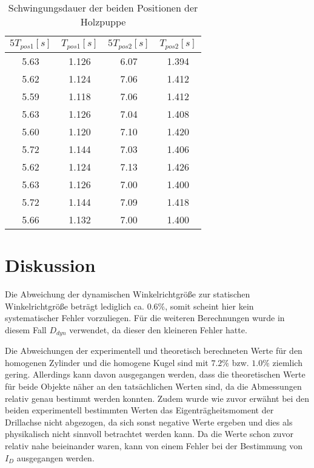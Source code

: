 \begin{table}
  \centering
  \caption{Schwingungsdauer der beiden Positionen der Holzpuppe}
  \begin{tabular}{c c | c c}
    \toprule $5T_{pos1} [s]$ & $T_{pos1} [s]$ & $5T_{pos2} [s]$ & $T_{pos2} [s]$ \\
    \midrule
    5.63 & 1.126 & 6.07 & 1.394 \\
    5.62 & 1.124 & 7.06 & 1.412 \\
    5.59 & 1.118 & 7.06 & 1.412 \\
    5.63 & 1.126 & 7.04 & 1.408 \\
    5.60 & 1.120 & 7.10 & 1.420 \\
    5.72 & 1.144 & 7.03 & 1.406 \\
    5.62 & 1.124 & 7.13 & 1.426 \\
    5.63 & 1.126 & 7.00 & 1.400 \\
    5.72 & 1.144 & 7.09 & 1.418 \\
    5.66 & 1.132 & 7.00 & 1.400 \\
    \bottomrule
  \end{tabular}
\end{table}

\newpage

\section{Diskussion}

Die Abweichung der dynamischen Winkelrichtgröße zur statischen Winkelrichtgröße beträgt lediglich
ca. $0.6 \%$, somit scheint hier kein systematischer Fehler vorzuliegen. Für die weiteren Berechnungen
wurde in diesem Fall $D_{dyn}$ verwendet, da dieser den kleineren Fehler hatte.

Die Abweichungen der experimentell und theoretisch berechneten Werte für den homogenen Zylinder und
die homogene Kugel sind mit $7.2 \%$ bzw. $1.0 \%$ ziemlich gering. Allerdings kann davon ausgegangen
werden, dass die theoretischen Werte für beide Objekte näher an den tatsächlichen Werten sind, da
die Abmessungen relativ genau bestimmt werden konnten. Zudem wurde wie zuvor erwähnt bei den beiden
experimentell bestimmten Werten das Eigenträgheitsmoment der Drillachse nicht abgezogen, da sich sonst
negative Werte ergeben und dies als physikalisch nicht sinnvoll betrachtet werden kann. Da die Werte
schon zuvor relativ nahe beieinander waren, kann von einem Fehler bei der Bestimmung von $I_D$ ausgegangen
werden.

